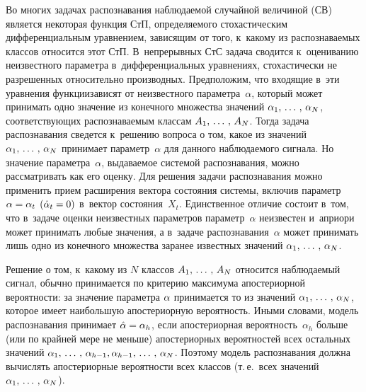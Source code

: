 \begin{multicols}{2}
Во многих задачах распознавания наблюда\-емой случайной величиной 
(СВ) является некоторая функция СтП, определяемого стохастическим
 дифференциальным уравнением, зависящим от того, к~какому из
распознаваемых классов относится этот СтП. В~непрерывных СтС задача сводится\linebreak
 к~оцениванию неизвестного
параметра в~дифференциальных уравнениях, стохастически не разрешенных относительно производных. 
Предположим, что входящие в~эти уравнения функции\linebreak зависят
от неизвестного параметра~$\alpha$, который может принимать одно
значение из конечного множества значений $\alpha_1,\,\ldots\,,\, \alpha_N$,
соответствующих распознаваемым классам $A_1 ,\,\ldots\,,\, A_N$. Тогда задача
распознавания сведется к~решению вопроса о том, какое из значений
$\alpha_1,\,\ldots\,,\, \alpha_N$ принимает параметр~$\alpha$ для данного
наблюдаемого сигнала. Но значение параметра~$\alpha$, выдаваемое
системой распознавания, можно рассматривать как его оценку.
Для решения задачи распознавания можно применить прием расширения
вектора состояния системы, включив параметр $\alpha\hm=\alpha_t$
$(\dot\alpha_t\hm=0)$ в~вектор состояния~$X_t$. Единственное отличие
состоит в~том, что в~задаче оценки неизвестных параметров параметр~$\alpha$ 
неизвестен и~априори может принимать
любые значения, а в~задаче распознавания~$\alpha$ может принимать
лишь одно из конечного множества заранее известных значений
$\alpha_1,\,\ldots\,,\, \alpha_N$.

Решение о том, к~какому из $N$ классов $A_1 ,\,\ldots\,,\, A_N$
 относится наблюдаемый сигнал, обычно принимается по критерию
 максимума апостериорной вероятности: за значение параметра
 $\alpha$ принимается то из значений $\alpha_1,\,\ldots\,,\, \alpha_N$,
 которое имеет наибольшую апостериорную вероятность. Иными
 словами, модель распознавания принимает  $\hat
\alpha\hm =\alpha_h$, если апостериорная вероятность~$\alpha_h$
больше (или по крайней мере не меньше) апостериорных
вероятностей всех остальных значений  $\alpha_1,\,\ldots\,,\, \alpha_{h-1},
\alpha_{h-1} ,\,\ldots\,,\, \alpha_N$. Поэтому модель распознавания должна
вычислять апостериорные вероятности всех классов (т.\,е.\ всех значений
$\alpha_1,\,\ldots\,,\, \alpha_N$).


\end{multicols}
